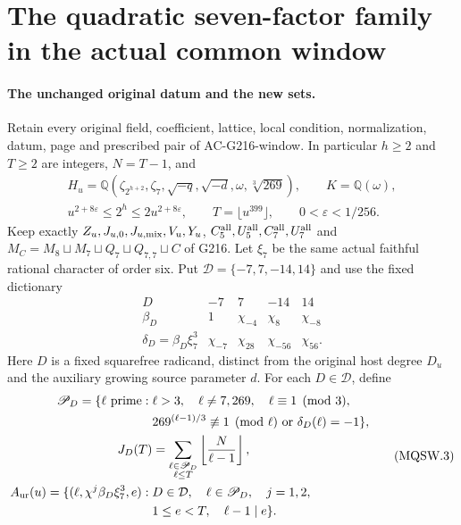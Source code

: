 \section{The quadratic seven-factor family in the actual common window}
\label{sec:mixed-cubic-quadratic-seven-conductor-window}

\paragraph{The unchanged original datum and the new sets.}
Retain every original field, coefficient, lattice, local condition,
normalization, datum, page and prescribed pair of AC-G216-window.
In particular $h\geq2$ and $T\geq2$ are integers, $N=T-1$, and
\[
 \begin{gathered}
 H_u=\mathbb Q(\zeta_{2^{h+2}},\zeta_7,\sqrt{-q},\sqrt{-d},
                        \omega,\sqrt[3]{269}),\qquad K=\mathbb Q(\omega),\\
 u^{2+8\varepsilon}\leq2^h\leq2u^{2+8\varepsilon},\qquad
 T=\lfloor u^{399}\rfloor,\qquad0<\varepsilon<1/256.
 \end{gathered}\tag{MQSW.1}
\]
Keep exactly $Z_u,J_{u,0},J_{u,\rm mix},V_u,Y_u$,
$C_5^{\rm all},U_5^{\rm all},C_7^{\rm all},U_7^{\rm all}$ and
$M_C=M_8\sqcup M_7\sqcup Q_7\sqcup Q_{7,7}\sqcup C$ of G216.
Let $\xi_7$ be the same actual faithful rational character of order six.
Put $\mathcal D=\{-7,7,-14,14\}$ and use the fixed dictionary
\[
 \begin{array}{c|rrrr}
 D&-7&7&-14&14\\\hline
 \beta_D&1&\chi_{-4}&\chi_8&\chi_{-8}\\
 \delta_D=\beta_D\xi_7^3&\chi_{-7}&\chi_{28}&\chi_{-56}&\chi_{56}.
 \end{array}\tag{MQSW.2}
\]
Here $D$ is a fixed squarefree radicand, distinct from the original
host degree $D_u$ and the auxiliary growing source parameter $d$.
For each $D\in\mathcal D$, define
\[
 \begin{split}
 \mathscr P_D=\{\ell\text{ prime}:{}&\ell>3,\quad\ell\ne7,269,
                         \quad\ell\equiv1\pmod3,\\
       &269^{(\ell-1)/3}\not\equiv1\pmod\ell
                                  \ \text{or}\ \delta_D(\ell)=-1\},\\
 J_D(T)&=\sum_{\substack{\ell\in\mathscr P_D\\\ell\leq T}}
                              \left\lfloor\frac{N}{\ell-1}\right\rfloor,\\
 A_{\rm ur}(u)=\{(\ell,\chi^j\beta_D\xi_7^3,e):{}&D\in\mathcal D,
       \quad\ell\in\mathscr P_D,\quad j=1,2,\\
                         &1\leq e<T,\quad\ell-1\mid e\}.
 \end{split}\tag{MQSW.3}
\]
